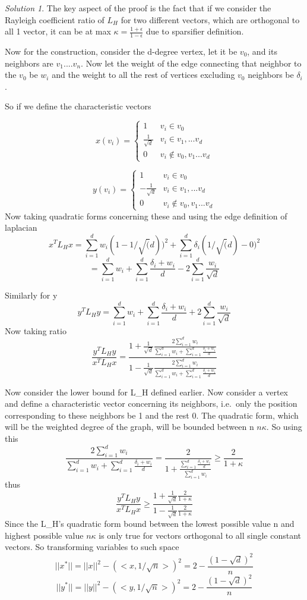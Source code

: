\documentclass[
  letterpaper,
  DIV=11,
  numbers=noendperiod]{scrartcl}
\theoremstyle{plain}
\theoremstyle{plain}
\theoremstyle{plain}
\theoremstyle{definition}
\theoremstyle{plain}
\theoremstyle{remark}
\newtheorem*{solution}{Solution}
\begin{document}
\begin{solution}

The key aspect of the proof is the fact that if we consider the Rayleigh
coefficient ratio of \(L_H\) for two different vectors, which are
orthogonal to all 1 vector, it can be at max
\(\kappa = \frac{1 + \epsilon}{1 - \epsilon}\) due to sparsifier
definition.

Now for the construction, consider the d-degree vertex, let it be
\(v_0\), and its neighbors are \(v_1 ....v_n\). Now let the weight of
the edge connecting that neighbor to the \(v_0\) be \(w_i\) and the
weight to all the rest of vertices excluding \(v_0\) neighbors be
\(\delta_i\).

So if we define the characteristic vectors

\[ x(v_i)=\begin {cases} 
      1 & v_i\in v_0 \\
      \frac{1}{\sqrt{d}} & v_i\in {v_1,...v_d} \\
      0 & v_i\notin {v_0,v_1...v_d} 
   \end{cases}
\]

\[ y(v_i)=\begin {cases} 
      1 & v_i\in v_0 \\
      -\frac{1}{\sqrt{d}} & v_i\in {v_1,...v_d} \\
      0 & v_i\notin {v_0,v_1...v_d} 
   \end{cases}
\] Now taking quadratic forms concerning these and using the edge
definition of laplacian \[
x^TL_Hx = \sum^{d}_{i=1}w_i(1-1/\sqrt(d))^2+\sum^d_{i=1}\delta_i(1/\sqrt(d)-0)^2 
\] \[
 = \sum^{d}_{i=1}w_i+\sum^{d}_{i=1}\frac{\delta_i+w_i}{d}-2\sum^d_{i=1}\frac{w_i}{\sqrt{d}} 
\]

Similarly for y \[
y^TL_Hy = \sum^{d}_{i=1}w_i+\sum^{d}_{i=1}\frac{\delta_i+w_i}{d}+2\sum^d_{i=1}\frac{w_i}{\sqrt{d}} 
\] Now taking ratio
\[\frac{y^TL_Hy}{x^TL_Hx}=\frac{1+\frac{1}{\sqrt{d}}\frac{2\sum^d_{i=1}w_i}{\sum^{d}_{i=1}w_i+\sum^{d}_{i=1}\frac{\delta_i+w_i}{d}}}{1-\frac{1}{\sqrt{d}}\frac{2\sum^d_{i=1}w_i}{\sum^{d}_{i=1}w_i+\sum^{d}_{i=1}\frac{\delta_i+w_i}{d}}}\]

Now consider the lower bound for L\_H defined earlier. Now consider a
vertex and define a characteristic vector concerning its neighbors,
i.e.~only the position corresponding to these neighbors be 1 and the
rest 0. The quadratic form, which will be the weighted degree of the
graph, will be bounded between n \(n\kappa\). So using this \[
\frac{2\sum^d_{i=1}w_i}{\sum^{d}_{i=1}w_i+\sum^{d}_{i=1}\frac{\delta_i+w_i}{d}}= \frac{2}{1+\frac{\sum^{d}_{i=1}\frac{\delta_i+w_i}{d}}{\sum^d_{i=1}w_i}} \geq \frac{2}{1+\kappa}
\] thus
\[\frac{y^TL_Hy}{x^TL_Hx}\geq \frac{1+\frac{1}{\sqrt{d}}\frac{2}{1+\kappa}}{1-\frac{1}{\sqrt{d}}\frac{2}{1+\kappa}}
\] Since the L\_H's quadratic form bound between the lowest possible
value n and highest possible value \(n\kappa\) is only true for vectors
orthogonal to all single constant vectors. So transforming variables to
such space \[
||x^*|| = ||x||^2-(<x,1/\sqrt{n}>)^2 = 2-\frac{(1-\sqrt{d})^2}{n}
\] \[
||y^*|| = ||y||^2-(<y,1/\sqrt{n}>)^2 = 2-\frac{(1-\sqrt{d})^2}{n}
\]


\end{solution}
\end{document}
